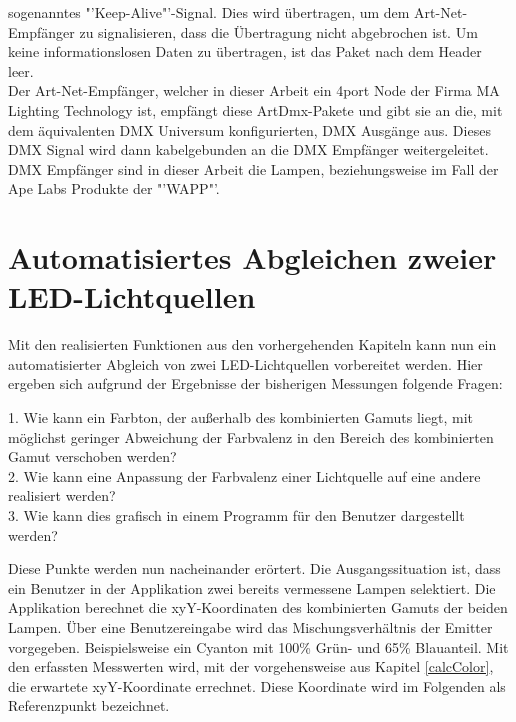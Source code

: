 \documentclass[11pt]{scrartcl}
\begin{document}
sogenanntes "'Keep-Alive"'-Signal. Dies wird übertragen, um dem Art-Net-Empfänger zu signalisieren, dass die Übertragung nicht abgebrochen ist. Um keine
informationslosen Daten zu übertragen, ist das Paket nach dem Header leer.\\
Der Art-Net-Empfänger, welcher in dieser Arbeit ein 4port Node der Firma MA Lighting Technology ist, empfängt diese ArtDmx-Pakete und gibt sie an die, mit dem
äquivalenten DMX Universum konfigurierten, DMX Ausgänge aus. Dieses DMX Signal wird dann kabelgebunden an die DMX Empfänger weitergeleitet.\\
DMX Empfänger sind in dieser Arbeit die Lampen, beziehungsweise im Fall der Ape Labs Produkte der "'WAPP"'.
\clearpage

\section{Automatisiertes Abgleichen zweier LED-Lichtquellen} \label{comparing}
Mit den realisierten Funktionen aus den vorhergehenden Kapiteln kann nun ein automatisierter Abgleich von zwei LED-Lichtquellen vorbereitet werden. Hier
ergeben sich aufgrund der Ergebnisse der bisherigen Messungen folgende Fragen:\\
\begin{addmargin}[2em]{0em}
    1. Wie kann ein Farbton, der außerhalb des kombinierten Gamuts liegt, mit möglichst geringer Abweichung der Farbvalenz in den Bereich des kombinierten Gamut
    verschoben werden?\\
    2. Wie kann eine Anpassung der Farbvalenz einer Lichtquelle auf eine andere realisiert werden?\\
    3. Wie kann dies grafisch in einem Programm für den Benutzer dargestellt werden?\\
\end{addmargin}
Diese Punkte werden nun nacheinander erörtert. Die Ausgangssituation ist, dass ein Benutzer in der Applikation zwei bereits vermessene Lampen selektiert. Die
Applikation berechnet die xyY-Koordinaten des kombinierten Gamuts der beiden Lampen. Über eine Benutzereingabe wird das Mischungsverhältnis der Emitter vorgegeben.
Beispielsweise ein Cyanton mit 100\% Grün- und 65\% Blauanteil. Mit den erfassten Messwerten wird, mit der vorgehensweise aus Kapitel \ref{calcColor}, die erwartete
xyY-Koordinate errechnet. Diese Koordinate wird im Folgenden als Referenzpunkt bezeichnet.
\end{document}
